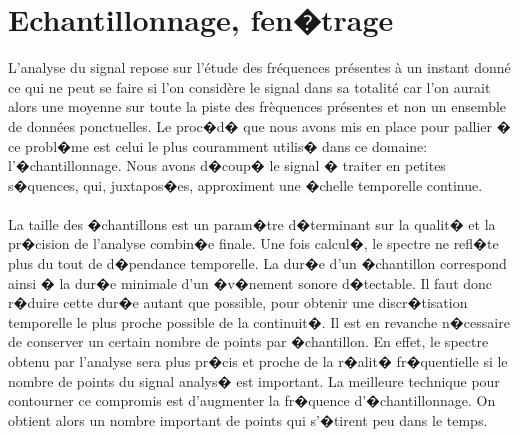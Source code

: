         
	\section{Echantillonnage, fen�trage}
        	L'analyse du signal repose sur l'étude des fréquences présentes à un instant donné ce qui ne peut se faire
        	si l'on considère le signal dans sa totalité car l'on aurait alors une moyenne sur toute la piste des frèquences présentes
        	et non un ensemble de données ponctuelles. Le proc�d� 
		que nous avons mis en place pour pallier � ce probl�me est celui le plus couramment utilis� dans ce domaine: 
		l'�chantillonnage. Nous avons d�coup� le signal � traiter en petites s�quences, qui, juxtapos�es, approximent une �chelle temporelle continue.
\paragraph{}
La taille des �chantillons est un param�tre d�terminant sur la qualit� et la pr�cision de l'analyse combin�e finale. 
	Une fois calcul�, le spectre ne refl�te plus du tout de d�pendance temporelle. La dur�e d'un �chantillon correspond 
	ainsi � la dur�e minimale d'un �v�nement sonore d�tectable. Il faut donc r�duire cette dur�e autant que possible, 
	pour obtenir une discr�tisation temporelle le plus proche possible de la continuit�. Il est en revanche n�cessaire 
	de conserver un certain nombre de points par �chantillon. En effet, le spectre obtenu par l'analyse sera plus pr�cis 
	et proche de la r�alit� fr�quentielle si le nombre de points du signal analys� est important. La meilleure technique 
	pour contourner ce compromis est d'augmenter la fr�quence d'�chantillonnage. 
	On obtient alors un nombre important de points qui s'�tirent peu dans le temps.
